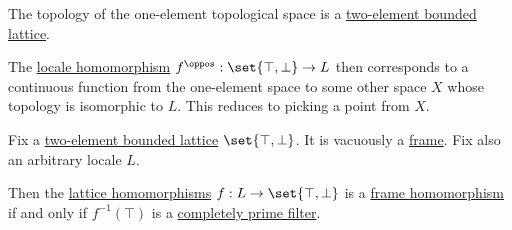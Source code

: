 \begin{remark}\label{rem:picking_a_point_from_a_locale}
  The topology of the one-element topological space is a \hyperref[def:bounded_lattice/trivial]{two-element bounded lattice}.

  The \hyperref[def:category_of_small_locales]{locale homomorphism} \( f^\oppos: \set{ \top, \bot } \to L \) then corresponds to a continuous function from the one-element space to some other space \( X \) whose topology is isomorphic to \( L \). This reduces to picking a point from \( X \).
\end{remark}

\begin{lemma}\label{thm:frame_homomorphism_kernel}
  Fix a \hyperref[def:bounded_lattice/trivial]{two-element bounded lattice} \( \set{ \top, \bot } \). It is vacuously a \hyperref[def:category_of_small_locales]{frame}. Fix also an arbitrary locale \( L \).

  Then the \hyperref[def:lattice/morphism]{lattice homomorphisms} \( f: L \to \set{ \top, \bot } \) is a \hyperref[def:category_of_small_frames]{frame homomorphism} if and only if \( f^{-1}(\top) \) is a \hyperref[def:lattice_ideal/prime]{completely prime filter}.
\end{lemma}
